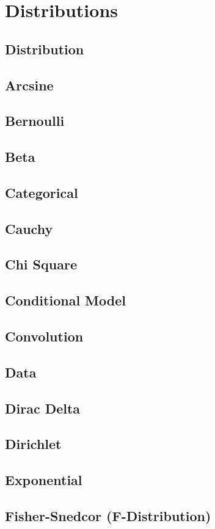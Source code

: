 \documentclass{article}
\begin{document}
\section{Distributions}
\subsection{Distribution}
\subsection{Arcsine}
\subsection{Bernoulli}
\subsection{Beta}
\subsection{Categorical}
\subsection{Cauchy}
\subsection{Chi Square}
\subsection{Conditional Model}
\subsection{Convolution}
\subsection{Data}
\subsection{Dirac Delta}
\subsection{Dirichlet}
\subsection{Exponential}
\subsection{Fisher-Snedcor (F-Distribution)}
\end{document}
